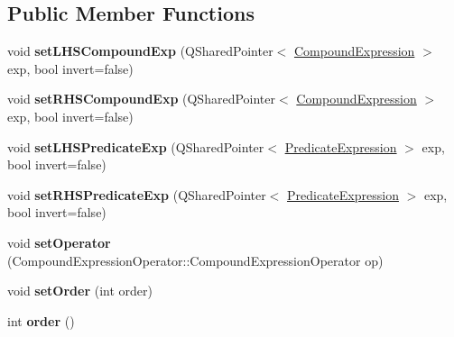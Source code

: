 \subsection*{Public Member Functions}
\begin{DoxyCompactItemize}
\item 
\hypertarget{class_picto_1_1_compound_expression_a5b878d7a88332058eb6eee94afafdd65}{void {\bfseries set\-L\-H\-S\-Compound\-Exp} (Q\-Shared\-Pointer$<$ \hyperlink{class_picto_1_1_compound_expression}{Compound\-Expression} $>$ exp, bool invert=false)}\label{class_picto_1_1_compound_expression_a5b878d7a88332058eb6eee94afafdd65}

\item 
\hypertarget{class_picto_1_1_compound_expression_a6a4d4b2793760a1f66322d88c57cb01e}{void {\bfseries set\-R\-H\-S\-Compound\-Exp} (Q\-Shared\-Pointer$<$ \hyperlink{class_picto_1_1_compound_expression}{Compound\-Expression} $>$ exp, bool invert=false)}\label{class_picto_1_1_compound_expression_a6a4d4b2793760a1f66322d88c57cb01e}

\item 
\hypertarget{class_picto_1_1_compound_expression_a51ec44709c82af6e3a665462c7d40ce0}{void {\bfseries set\-L\-H\-S\-Predicate\-Exp} (Q\-Shared\-Pointer$<$ \hyperlink{class_picto_1_1_predicate_expression}{Predicate\-Expression} $>$ exp, bool invert=false)}\label{class_picto_1_1_compound_expression_a51ec44709c82af6e3a665462c7d40ce0}

\item 
\hypertarget{class_picto_1_1_compound_expression_ab4f38bc01f21787f14a437c903c1d05c}{void {\bfseries set\-R\-H\-S\-Predicate\-Exp} (Q\-Shared\-Pointer$<$ \hyperlink{class_picto_1_1_predicate_expression}{Predicate\-Expression} $>$ exp, bool invert=false)}\label{class_picto_1_1_compound_expression_ab4f38bc01f21787f14a437c903c1d05c}

\item 
\hypertarget{class_picto_1_1_compound_expression_afcd3c086eae1cc037ecb068fa7f1c1da}{void {\bfseries set\-Operator} (Compound\-Expression\-Operator\-::\-Compound\-Expression\-Operator op)}\label{class_picto_1_1_compound_expression_afcd3c086eae1cc037ecb068fa7f1c1da}

\item 
\hypertarget{class_picto_1_1_compound_expression_a747d834255761713985cad4cc8f3309e}{void {\bfseries set\-Order} (int order)}\label{class_picto_1_1_compound_expression_a747d834255761713985cad4cc8f3309e}

\item 
\hypertarget{class_picto_1_1_compound_expression_ad6c6a469ccb2bd6c0edaa75e474cb22b}{int {\bfseries order} ()}\label{class_picto_1_1_compound_expression_ad6c6a469ccb2bd6c0edaa75e474cb22b}


\end{DoxyCompactItemize}
